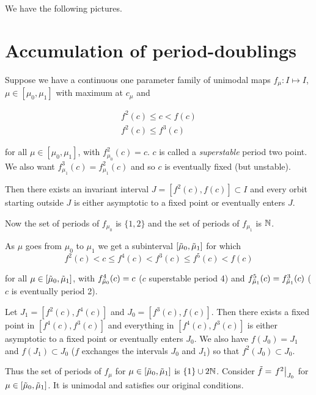 \documentclass{notes}
\theoremstyle{plain}
\begin{document}
We have the following pictures.

\vspace{2in}

\section{Accumulation of period-doublings}

Suppose we have a continuous one parameter family of
unimodal maps $f_\mu \colon I \mapsto I$, $\mu \in [\mu_0,\mu_1]$
with maximum at $c_\mu$ and

\begin{gather*}
f^2(c) \le c < f(c) \\
f^2(c) \le f^3(c)
\end{gather*}

for all $\mu \in [\mu_0,\mu_1]$, with $f^2_{\mu_0}(c) = c$.
$c$ is called a \emph{superstable} period two point.  We also
want $f^3_{\mu_1}(c) = f^2_{\mu_1}(c)$ and so $c$ is eventually fixed
(but unstable).

\vspace{1.5in}

Then there exists an invariant interval $J = [ f^2(c),f(c)] \subset I$
and every orbit starting outside $J$ is either asymptotic to a fixed
point or eventually enters $J$.  

Now the set of periods of $f_{\mu_0}$ is $\{ 1,2\}$ and
the set of periods of $f_{\mu_1}$ is $\mathbb{N}$.

As $\mu$ goes from $\mu_0$ to $\mu_1$ we get a subinterval
$[\Tilde{\mu}_0,\Tilde{\mu}_1]$ for which
\[
f^2(c) < c \le f^4(c) < f^3(c) \le f^5(c) < f(c)
\]

for all $\mu \in [\Tilde{\mu}_0,\Tilde{\mu}_1]$, with
$f^4_{\Tilde{\mu}_0}(c) = c$ ($c$ superstable period 4)
and $f^5_{\Tilde{\mu}_1}(c) = f^3_{\Tilde{\mu}_1}(c)$ ($c$ is
eventually period 2).

\vspace{2in}

Let $J_1 = [f^2(c),f^4(c)]$ and $J_0 = [f^3(c),f(c)]$.  Then
there exists a fixed point in $[f^4(c),f^3(c)]$ and everything
in $[f^4(c),f^3(c)]$ is either asymptotic to a fixed point
or eventually enters $J_0$.  We also have
$f(J_0) = J_1$ and $f(J_1) \subset J_0$ ($f$ exchanges the
intervals $J_0$ and $J_1$) so that $f^2(J_0) \subset J_0$.

Thus the set of periods of $f_\mu$ for $\mu \in
[\Tilde{\mu}_0,\Tilde{\mu}_1]$ is $\{ 1 \} \cup 2 \mathbb{N}$.
Consider $\Tilde{f} = \left.f^2\right|_{J_0}$ for
$\mu \in [\Tilde{\mu}_0,\Tilde{\mu}_1]$.  It is unimodal
and satisfies our original conditions.
\end{document}
